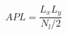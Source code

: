 \documentclass[10pt,A4paper,oneside]{article}
\begin{document}
\begin{equation}
  APL=\frac{L_xL_y}{N_l/2}
\end{equation}
\end{document}
